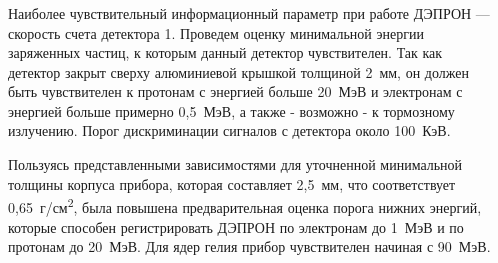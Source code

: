 \documentclass[t, aspectratio=43]{beamer}
\begin{document}
\begin{frame}
\frametitle{\insertsection} 
\framesubtitle{\insertsubsection}
\begin{columns}[T]
\begin{column}{.5\textwidth}
	\begin{block}{}			
		{\tiny 
		Наиболее чувствительный информационный параметр при работе ДЭПРОН --- скорость счета детектора 1. Проведем оценку минимальной энергии заряженных частиц, к которым данный детектор чувствителен. Так как детектор закрыт сверху алюминиевой крышкой толщиной 2~мм, он должен быть чувствителен к протонам с энергией больше 20~МэВ и электронам с энергией больше примерно 0,5~МэВ, а также - возможно - к тормозному излучению. Порог дискриминации сигналов с детектора около 100~КэВ. %
		
		Пользуясь представленными зависимостями для уточненной минимальной толщины корпуса прибора, которая составляет 2,5~мм, что соответствует 0,65~г/см\textsuperscript{2}, была повышена предварительная оценка порога нижних энергий, которые способен регистрировать ДЭПРОН по электронам до 1~МэВ и по протонам до 20~МэВ. Для ядер гелия прибор чувствителен начиная с 90~МэВ. %
		
	}
	\end{block}
\end{column}
\begin{column}{.5\textwidth}
	\begin{block}{}


\begin{center}


\end{center}
\end{block}
\end{column}
\end{columns}
\end{frame}
\end{document}
